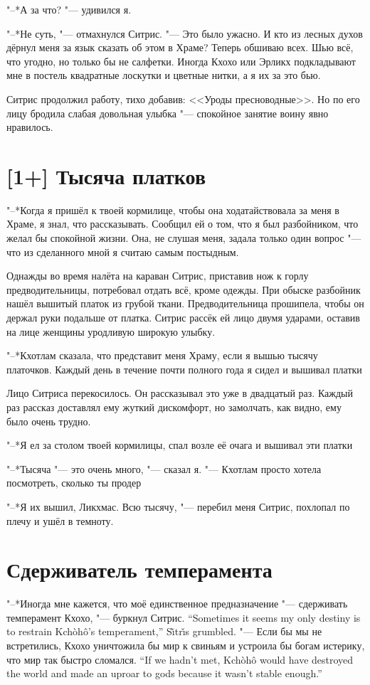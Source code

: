 "--*А за что? "--- удивился я.

"--*Не суть, "--- отмахнулся Ситрис.
"--- Это было ужасно.
И кто из лесных духов дёрнул меня за язык сказать об этом в Храме?
Теперь обшиваю всех.
Шью всё, что угодно, но только бы не салфетки.
Иногда Кхохо или Эрликх подкладывают мне в постель квадратные лоскутки и цветные нитки, а я их за это бью.

Ситрис продолжил работу, тихо добавив: <<Уроды пресноводные>>.
Но по его лицу бродила слабая довольная улыбка "--- спокойное занятие воину явно нравилось.

\section{[1+] Тысяча платков}

"--*Когда я пришёл к твоей кормилице, чтобы она ходатайствовала за меня в Храме, я знал, что рассказывать.
Сообщил ей о том, что я был разбойником, что желал бы спокойной жизни.
Она, не слушая меня, задала только один вопрос "--- что из сделанного мной я считаю самым постыдным.

Однажды во время налёта на караван Ситрис, приставив нож к горлу предводительницы, потребовал отдать всё, кроме одежды.
При обыске разбойник нашёл вышитый платок из грубой ткани.
Предводительница прошипела, чтобы он держал руки подальше от платка.
Ситрис рассёк ей лицо двумя ударами, оставив на лице женщины уродливую широкую улыбку.

"--*Кхотлам сказала, что представит меня Храму, если я вышью тысячу платочков.
Каждый день в течение почти полного года я сидел и вышивал платки\ldotst

Лицо Ситриса перекосилось.
Он рассказывал это уже в двадцатый раз.
Каждый раз рассказ доставлял ему жуткий дискомфорт, но замолчать, как видно, ему было очень трудно.

"--*Я ел за столом твоей кормилицы, спал возле её очага и вышивал эти платки\ldotst

"--*Тысяча "--- это очень много, "--- сказал я.
"--- Кхотлам просто хотела посмотреть, сколько ты продер\ldotst

"--*Я их вышил, Ликхмас.
Всю тысячу, "--- перебил меня Ситрис, похлопал по плечу и ушёл в темноту.

\section{Сдерживатель темперамента}

{"--*Иногда мне кажется, что моё единственное предназначение "--- сдерживать темперамент Кхохо, "--- буркнул Ситрис.}
{``Sometimes it seems my only destiny is to restrain Kch\`{o}h\^{o}'s temperament,'' S\~{\i}tr\v{\i}s grumbled.}
{"--- Если бы мы не встретились, Кхохо уничтожила бы мир к свиньям и устроила бы богам истерику, что мир так быстро сломался.}
{``If we hadn't met, Kch\`{o}h\^{o} would have destroyed the world and made an uproar to gods because it wasn't stable enough.''}

